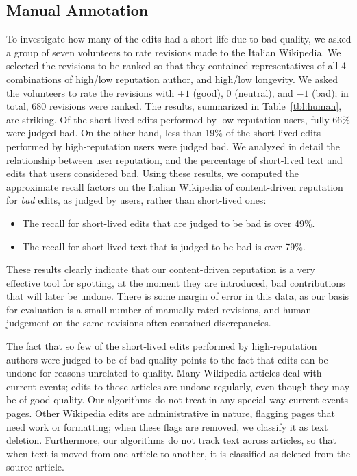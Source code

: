 \subsection{Manual Annotation}

To investigate how many of the edits had a short life due to bad quality,
we asked a group of seven volunteers to rate revisions made to the
Italian Wikipedia.
We selected the revisions to be ranked so that they contained
representatives of all 4 combinations of high/low reputation author,
and high/low longevity.
We asked the volunteers to rate the revisions with $+1$ (good),
$0$ (neutral), and $-1$ (bad); in total, 680 revisions
were ranked.
The results, summarized in Table~\ref{tbl:human}, are striking.
Of the short-lived edits performed by low-reputation users, fully
66\% were judged bad.
On the other hand, less than 19\% of the short-lived edits performed by
high-reputation users were judged bad.
We analyzed in detail the relationship between user reputation, and
the percentage of short-lived text and edits that users considered bad.
Using these results, we computed the approximate recall factors on the
Italian Wikipedia of content-driven reputation for {\em bad\/} edits,
as judged by users, rather than short-lived ones:
%
\begin{itemize}

\item The recall for short-lived edits that are judged to be bad is over
  49\%.

\item The recall for short-lived text that is judged to be bad is over
  79\%.

\end{itemize}
%
These results clearly indicate that our content-driven reputation is a
very effective tool for spotting, at the moment they are introduced,
bad contributions that will later be undone.
There is some margin of error in this data, as our basis for
evaluation is a small number of manually-rated revisions, and human
judgement on the same revisions often contained discrepancies.

The fact that so few of the short-lived edits performed by
high-reputation authors were judged to be of bad quality points to the
fact that edits can be undone for reasons unrelated to quality.
Many Wikipedia articles deal with current events; edits to those
articles are undone regularly, even though they may be of good
quality.
Our algorithms do not treat in any special way current-events pages.
Other Wikipedia edits are administrative in nature, flagging pages that
need work or formatting; when these flags are removed, we classify it
as text deletion.
Furthermore, our algorithms do not track text across articles, so that
when text is moved from one article to another, it is classified as
deleted from the source article.

